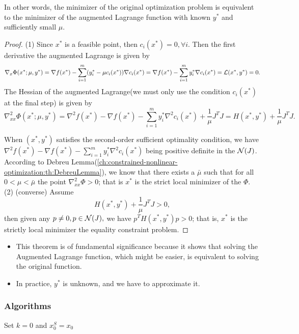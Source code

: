 \begin{refsection}
\begin{theorem}
In other words, the minimizer of the original optimization problem is equivalent to the minimizer of the augmented Lagrange function with known $y^*$ and sufficiently small $\mu$.  
\end{theorem}
\begin{proof}
(1)
Since $x^*$ is a feasible point, then $c_i(x^*) = 0, \forall i$. Then the first derivative the augmented Lagrange is given by 
$$\nabla_x \Phi(x^*;\mu, y^*) = \nabla f(x^*) - \sum_{i=1}^m (y_i^* - \mu c_i(x^*))\nabla c_i(x^*) = \nabla f(x^*) - \sum_{i=1}^m y_i^*\nabla c_i(x^*) = \mathcal{L}(x^*,y^*) = 0.$$ 
The Hessian of the augmented Lagrange(we must only use the condition $c_i(x^*)$ at the final step) is given by
$$\nabla_{xx}^2 \Phi(x^*;\mu, y^*) = \nabla^2 f(x^*) - \nabla f(x^*) - \sum_{i=1}^m y_i^*\nabla^2 c_i(x^*) + \frac{1}{\mu}J^TJ = H(x^*,y^*) + \frac{1}{\mu}J^TJ.$$

When $(x^*,y^*)$ satisfies the  second-order sufficient optimality condition, we have $ \nabla^2 f(x^*) - \nabla f(x^*) - \sum_{i=1}^m y_i^*\nabla^2 c_i(x^*)$ being positive definite in the $\mathcal{N}(J)$. According to Debreu Lemma(\autoref{ch:constrained-nonlinear-optimization:th:DebreuLemma}), we know that  there exists a $\bar{\mu}$ such that for all $0<\mu <\bar{\mu}$ the point $\nabla_{xx}^2\Phi >0$; that is $x^*$ is the strict local minimizer of the $\Phi$. 
(2) (converse)
Assume $$H(x^*,y^*) + \frac{1}{\mu}J^TJ > 0,$$
then given any $p\neq 0,p\in \mathcal{N}(J),$ we have $p^TH(x^*,y^*)p > 0$; that is, $x^*$ is the strictly local minimizer the equality constraint problem.
\end{proof}


\begin{remark}\hfill
\begin{itemize}
	\item This theorem is of fundamental significance because it shows that solving the Augmented Lagrange function, which might be easier, is equivalent to solving the original function.
	\item In practice, $y^*$ is unknown, and we have to approximate it.
\end{itemize}

\end{remark}

\subsubsection{Algorithms}
\begin{algorithm}[H]
	\SetAlgoLined
	Set $k = 0$ and $x_0^S = x_0$ \\
\end{algorithm}
\end{refsection}
